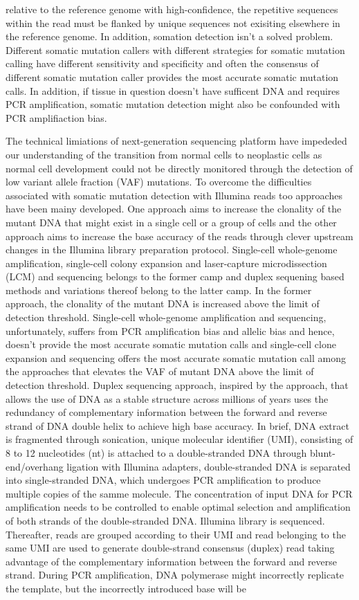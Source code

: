 relative to the reference genome with high-confidence, the repetitive sequences within the read must be flanked by unique sequences not exisiting elsewhere in the reference genome. In addition, somation detection isn't a solved problem. Different somatic mutation callers with different strategies for somatic mutation calling have different sensitivity and specificity and often the consensus of different somatic mutation caller provides the most accurate somatic mutation calls. In addition, if tissue in question doesn't have sufficent DNA and requires PCR amplification, somatic mutation detection might also be confounded with PCR amplifiaction bias.


The technical limiations of next-generation sequencing platform have impededed our understanding of the transition from normal cells to neoplastic cells as normal cell development could not be directly monitored through the detection of low variant allele fraction (VAF) mutations. To overcome the difficulties associated with somatic mutation detection with Illumina reads too approaches have been mainy developed. One approach aims to increase the clonality of the mutant DNA that might exist in a single cell or a group of cells and the other approach aims to increase the base accuracy of the reads through clever upstream changes in the Illumina library preparation protocol. Single-cell whole-genome amplification, single-cell colony expansion and laser-capture microdissection (LCM) and sequencing belongs to the former camp and duplex sequening based methods and variations thereof belong to the latter camp. In the former approach, the clonality of the mutant DNA is increased above the limit of detection threshold. Single-cell whole-genome amplification and sequencing, unfortunately, suffers from PCR amplification bias and allelic bias and hence, doesn't provide the most accurate somatic mutation calls and single-cell clone expansion and sequencing offers the most accurate somatic mutation call among the approaches that elevates the VAF of mutant DNA above the limit of detection threshold. Duplex sequencing approach, inspired by the approach, that allows the use of DNA as a stable structure across millions of years uses the redundancy of complementary information between the forward and reverse strand of DNA double helix to achieve high base accuracy. In brief, DNA extract is fragmented through sonication,  unique molecular identifier (UMI), consisting of 8 to 12 nucleotides (nt) is attached to a double-stranded DNA through blunt-end/overhang ligation with Illumina adapters, double-stranded DNA is separated into single-stranded DNA, which undergoes PCR amplification to produce multiple copies of the samme molecule. The concentration of input DNA for PCR amplification needs to be controlled to enable optimal selection and amplification of both strands of the double-stranded DNA. Illumina library is sequenced. Thereafter, reads are grouped according to their UMI and read belonging to the same UMI are used to generate double-strand consensus (duplex) read taking advantage of the complementary information between the forward and reverse strand. During PCR amplification, DNA polymerase might incorrectly replicate the template, but the incorrectly introduced base will be 